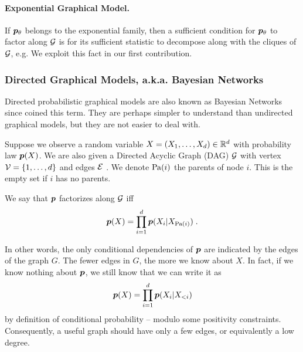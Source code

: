 \paragraph{Exponential Graphical Model.}
If $\bm{p}_{\theta}$ belongs to the exponential family, then a sufficient condition for $\bm{p}_{\theta}$  to factor along ${\mathcal G}$ is for its sufficient statistic to decompose along with the cliques of ${\mathcal G}$, e.g.
We exploit this fact in our first contribution.


\subsubsection{Directed Graphical Models, a.k.a. Bayesian Networks} 
Directed probabilistic graphical models are also known as Bayesian Networks since \citet{pearl1985bayesian} coined this term.
They are perhaps simpler to understand than undirected graphical models, but they are not easier to deal with.

Suppose we observe a random variable $X=(X_1, \dots, X_d) \in \mathbb{R}^d$ with probability law $\bm{p}(X)$. 
We are also given a Directed Acyclic Graph (DAG) ${\mathcal G}$ with vertex ${\mathcal V}=\{1, \dots, d \}$ and edges ${\mathcal E}$ . 
We denote $\operatorname{\mathrm{Pa}}(i)$ the parents of node $i$. 
This is the empty set if $i$ has no parents. 
\begin{definition}
	We say that $\bm{p}$ factorizes along ${\mathcal G}$ iff
	\begin{align}
		\bm{p}(X) = \prod_{i=1}^d \bm{p}(X_i | X_{\operatorname{\mathrm{Pa}}(i)}) \; .
	\end{align}
\end{definition}
In other words, the only conditional dependencies of $\bm{p}$ are indicated by the edges of the graph $G$. The fewer edges in $G$, the more we know about $X$. In fact, if we know nothing about $\bm{p}$, we still know that we can write it as 
\begin{align}
	\bm{p}(X) = \prod_{i=1}^d \bm{p}(X_i | X_{<i} )
\end{align}
by definition of conditional probability -- modulo some positivity constraints. Consequently, a useful graph should have only a few edges, or equivalently a low degree.

